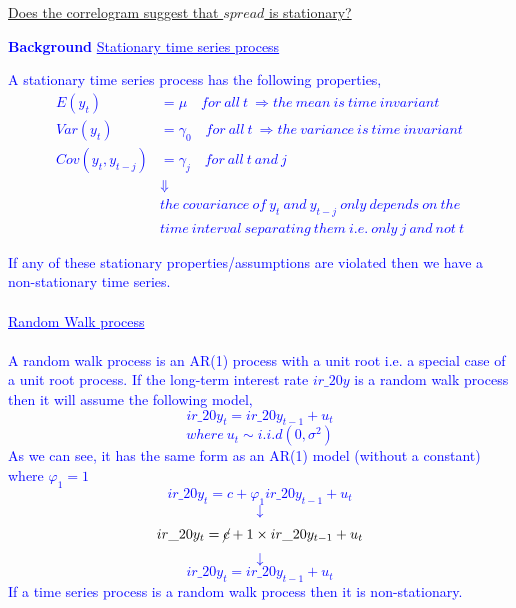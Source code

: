 \documentclass[12pt]{report}
\newenvironment{blueframed}[1][blue]
{\def\FrameCommand{\fboxsep=\FrameSep\fcolorbox{#1}{white}}%
\MakeFramed {\advance\hsize-\width \FrameRestore}}
{\endMakeFramed}
\begin{document}
\noindent \uline{Does the correlogram suggest that $spread$ is stationary?}

\justify
\begin{blueframed}
	\textcolor{blue}{\textbf{Background}}
	\vspace{-\baselineskip}
	\justify
	\textcolor{blue}{\underline{Stationary time series process}}
	
	\noindent \textcolor{blue}
	{
		A stationary time series process has the following properties,
		\begin{align*}
		E(y_t) &= \mu \quad for\ all\ t\ \Rightarrow the\ mean\ is\ time\ invariant \\
		Var(y_t) &= \gamma_0 \quad for\ all\ t\ \Rightarrow the\ variance\ is\ time\ invariant \\
		Cov(y_t,y_{t-j}) &= \gamma_j \quad for\ all\ t\ and\ j \\
		&\Downarrow \\
		&the\ covariance\ of\ y_t\ and\ y_{t-j}\ only\ depends\ on\ the \\
		&time\ interval\ separating\ them\ i.e.\ only\ j\ and\ not\ t 
		\end{align*}
	}
\end{blueframed}
\justify
\begin{blueframed}
	
	\noindent \textcolor{blue}
	{
		If any of these stationary properties/assumptions are violated then we have a non-stationary time series. \\ \\
		\uline{Random Walk process} \\ \\
		A random walk process is an AR(1) process with a unit root i.e. a special case of a unit root process. If the long-term interest rate $ir\_20y$ is a random walk process then it will assume the following model, $$ir\_20y_t = ir\_20y_{t-1} + u_t$$ $$where\ u_t \sim i.i.d(0,\sigma^2)$$
		As we can see, it has the same form as an AR(1) model (without a constant) where $\varphi_1=1$ 
		$$ir\_20y_t = c + \varphi_1ir\_20y_{t-1} + u_t$$
		$$\downarrow$$ $$ir\_20y_t = \cancel{c} + 1\times ir\_20y_{t-1} + u_t$$
		$$\downarrow$$
		$$ir\_20y_t = ir\_20y_{t-1} + u_t$$ If a time series process is a random walk process then it is non-stationary.
	}
\end{blueframed}
\end{document}
